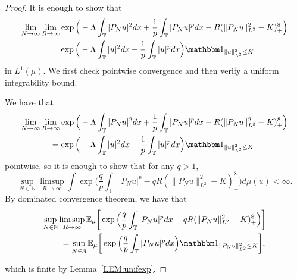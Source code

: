 \documentclass[letterpaper, 11pt,  reqno]{amsart}
\theoremstyle{definition}
\newcommand{\1}{\mathbbm 1}
\newcommand{\noi}{\noindent}
\newcommand{\T}{\mathbb{T}}
\newcommand{\0}{\mathbf 0}
\newcommand{\E}{\mathbb{E}}
\newcommand{\Ld}{\Lambda}
\newcommand{\N}{\mathbb{N}}
\newcommand{\gp}[1]{\marginpar{\color{red} $\Leftarrow\Leftarrow\Leftarrow$}{\smallskip \noi\color{teal}GP: #1}\smallskip}
\numberwithin{equation}{section}
\numberwithin{theorem}{section}
\begin{document}
 
 
 
\begin{proof}
 
 
    It is enough to show that 
    \begin{align*}
    \lim_{N \to \infty}& \lim_{R \to \infty}   \exp\Big( - \Ld \int_\T |P_Nu|^2 dx + \frac 1p \int_\T |P_Nu|^p dx - R(\|P_Nu\|_{L^2}^2 - K)_+^8 \Big)    \\
        &\quad \,= \exp\Big( -\Ld \int_\T |u|^2 dx + \frac 1p \int_\T |u|^p dx\Big) \1_{\| u\|_{L^2}^2
    \le K}
    \end{align*} 
    in $L^1(\mu)$.
    We first check pointwise convergence and then verify a uniform
    integrability bound.    
    
    
    We have that 
    \begin{align*}
 \lim_{N \to \infty} &  \lim_{R \to \infty} \exp\Big( - \Ld \int_\T |P_Nu|^2 dx + \frac 1p \int_\T |P_Nu|^p dx - R(\|P_Nu\|_{L^2}^2 - K)_+^8 \Big)         \\
        &\quad \,= \exp\Big( -\Ld \int_\T |u|^2 dx + \frac 1p \int_\T |u|^p dx\Big) \1_{\| u\|_{L^2}^2
    \le K}
    \end{align*} 
    pointwise, so it is enough to show that for any $q>1$, 
    \begin{equation}
        \sup_{N \in \N} \limsup_{R \to \infty}  \int \exp\Big(  \frac qp \int_\T |P_Nu|^p - qR(\|P_Nu\|_{L^2}^2 - K)_+^8 \Big) d\mu(u) < \infty. 
    \end{equation}
    By dominated convergence theorem, we have that 
    \begin{align*}
     \sup_{N \in \N}       &   \limsup_{R \to \infty}  \E_\mu \bigg[  \exp\Big(  \frac qp \int_\T |P_Nu|^p dx - qR(\|P_Nu\|_{L^2}^2 - K)_+^8 \Big) \bigg] \\
        &\,\,=  \sup_{N \in \N} \E_\mu \bigg[ \exp\Big(  \frac qp \int_\T |P_Nu|^p dx \Big)\1_{\| P_Nu \|_{L^2}^2 \le K} \bigg],
    \end{align*}
 
 
\noi
    which is finite by Lemma~\ref{LEM:unifexp}.
\end{proof}
 
 
 
  
\end{document}
